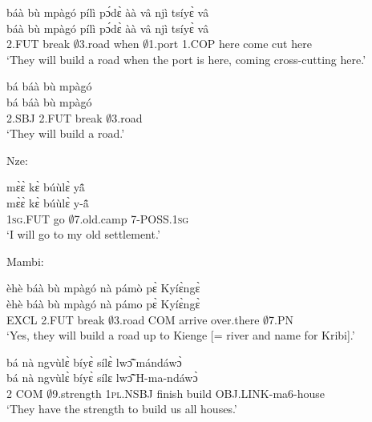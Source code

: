 \begin{exe} 
\exC\label{196}
  \glll báà bù mpàgó pílì pɔ́dɛ̀ àà vâ njì tsíyɛ̀ vâ \\
      báà bù mpàgó pílì pɔ́dɛ̀ àà vâ njì tsíyɛ̀ vâ \\
         2.FUT break $\emptyset$3.road when $\emptyset$1.port 1.COP here come cut here \\
    \trans `They will build a road when the port is here, coming cross-cutting here.'
\end{exe}

\begin{exe} 
\exC\label{197}
  \glll bá báà bù mpàgó \\
       bá báà bù mpàgó \\
        2.SBJ 2.FUT break $\emptyset$3.road  \\
    \trans `They will build a road.'
\end{exe}

\noindent Nze:

\begin{exe} 
\exC\label{198} 
  \glll mɛ̀ɛ̀ kɛ̀ búùlɛ̀ yã̂ \\
        mɛ̀ɛ̀ kɛ̀ búùlɛ̀ y-ã̂ \\
        1\textsc{sg}.FUT go $\emptyset$7.old.camp 7-POSS.1\textsc{sg}  \\
    \trans `I will go to my old settlement.'
\end{exe}

\noindent Mambi:

\begin{exe} 
\exC\label{199} 
  \glll èhè báà bù mpàgó nà pámò pɛ̀ Kyíɛ̀ngɛ̀ \\
        èhè báà bù mpàgó nà pámo pɛ̀ Kyíɛ̀ngɛ̀ \\
        EXCL 2.FUT break $\emptyset$3.road COM arrive over.there $\emptyset$7.PN  \\
    \trans `Yes, they will build a road up to Kienge [= river and name for Kribi].'
\end{exe}

\begin{exe} 
\exC\label{200}
  \glll bá nà ngvùlɛ̀ bíyɛ̀ sílɛ̀ lwɔ̃̂ mándáwɔ̀ \\
        bá nà ngvùlɛ̀ bíyɛ̀ sílɛ lwɔ̃̂ H-ma-ndáwɔ̀ \\
        2 COM  $\emptyset$9.strength 1\textsc{pl}.NSBJ finish build OBJ.LINK-ma6-house \\
    \trans `They have the strength to build us all houses.'
\end{exe}

